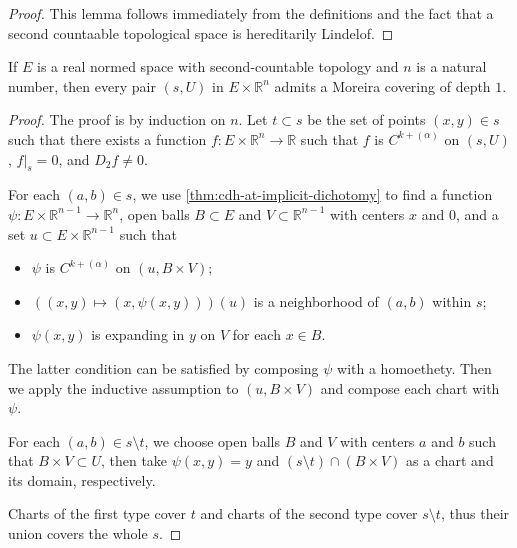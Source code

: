\begin{proof}
  This lemma follows immediately from the definitions
  and the fact that a second countaable topological space is hereditarily Lindelof.
\end{proof}

\begin{lemma}%
  \label{lem:moreira-covering-one}
  If \(E\) is a real normed space with second-countable topology and \(n\) is a natural number,
  then every pair \((s, U)\) in \(E\times\mathbb R^{n}\)
  admits a Moreira covering of depth \(1\).
\end{lemma}

\begin{proof}
  The proof is by induction on \(n\).
  Let \(t \subset s\) be the set of points \((x, y)\in s\)
  such that there exists a function \(f\colon E\times\mathbb R^{n}\to \mathbb R\)
  such that \(f\) is \(C^{k+(\alpha)}\) on \((s, U)\), \(\left.f\right|_{s}=0\), and \(D_{2}f\ne 0\).

  For each \((a, b)\in s\), we use \autoref{thm:cdh-at-implicit-dichotomy}
  to find a function \(\psi\colon E\times\mathbb R^{n - 1}\to \mathbb R^{n}\),
  open balls \(B\subset E\) and \(V\subset\mathbb R^{n - 1}\) with centers \(x\) and \(0\),
  and a set \(u\subset E\times\mathbb R^{n - 1}\) such that
  \begin{itemize}
  \item \(\psi\) is \(C^{k+(\alpha)}\) on \((u, B\times V)\);
  \item \(((x, y) \mapsto (x, \psi(x, y)))(u)\) is a neighborhood of \((a, b)\) within \(s\);
  \item \(\psi(x, y)\) is expanding in \(y\) on \(V\) for each \(x\in B\).
  \end{itemize}
  The latter condition can be satisfied by composing \(\psi\) with a homoethety.
  Then we apply the inductive assumption to \((u, B\times V)\) and compose each chart with \(\psi\).

  For each \((a, b)\in s \setminus t\), we choose open balls \(B\) and \(V\) with centers \(a\) and \(b\)
  such that \(B\times V\subset U\), then take \(\psi(x, y) = y\) and \((s \setminus t)\cap (B\times V)\)
  as a chart and its domain, respectively.

  Charts of the first type cover \(t\) and charts of the second type cover \(s \setminus t\),
  thus their union covers the whole \(s\).
\end{proof}

